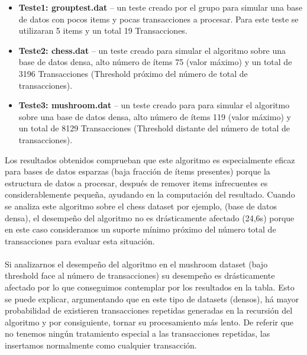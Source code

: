 \documentclass[12pt,spanish]{article}
\begin{document}
\begin{itemize}
\item\textbf{Teste1: grouptest.dat} – un teste creado por el grupo para simular una base de datos con pocos items y pocas transacciones a procesar. Para este teste se utilizaran 5 items y un total 19 Transacciones.
\item\textbf{Teste2: chess.dat} – un teste creado para simular el algoritmo sobre una base de datos densa, alto número de ítems 75 (valor máximo) y un total de 3196 Transacciones (Threshold próximo del número de total de transacciones).
\item\textbf{Teste3: mushroom.dat} – un teste creado para para simular el algoritmo sobre una base de datos densa, alto número de ítems 119 (valor máximo) y un total de 8129 Transacciones (Threshold distante del número de total de transacciones).

\end{itemize}
\newpage
Los resultados obtenidos comprueban que este algoritmo es especialmente eficaz para bases de datos esparzas (baja fracción de ítems presentes) porque la estructura de datos a procesar, después de remover items infrecuentes es considerablemente pequeña, ayudando en la computación del resultado. 
Cuando se analiza este algoritmo sobre el  chess dataset por ejemplo, (base de datos densa), el desempeño del algoritmo no es drásticamente afectado (24,6s) porque en este caso consideramos un suporte mínimo próximo del número total de transacciones para evaluar esta situación. 
\\\\
Si analizarnos el desempeño del algoritmo en el mushroom dataset (bajo threshold face al número de transacciones) su desempeño es drásticamente afectado por lo que conseguimos contemplar por los resultados en la tabla. Esto se puede explicar, argumentando que en este tipo de datasets (densos), há mayor probabilidad de existieren transacciones repetidas generadas en la recursión del algoritmo y por consiguiente, tornar su procesamiento más lento. De referir que no tenemos ningún tratamiento especial a las transacciones repetidas, las insertamos normalmente como cualquier transacción.
\end{document}
